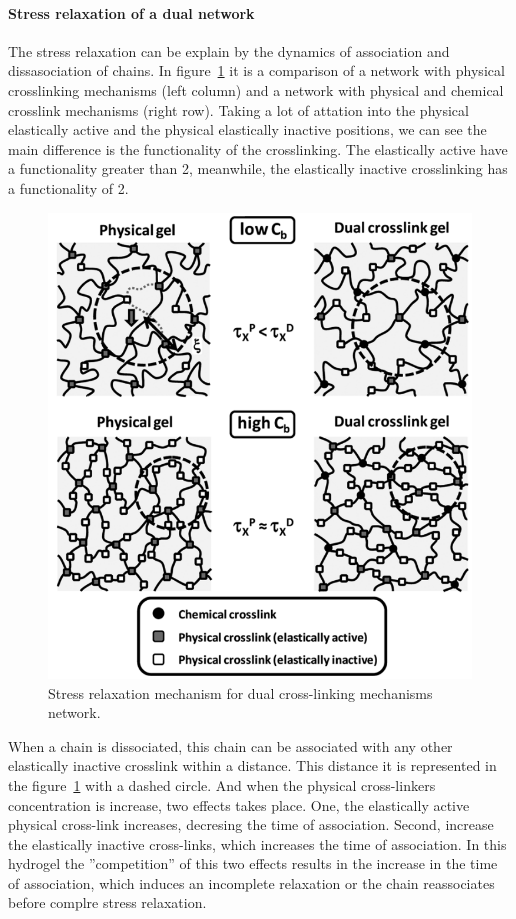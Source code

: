 \paragraph{Stress relaxation of a dual network}
The stress relaxation can be explain by the dynamics of association and dissasociation of chains\citep{naritaViscoelasticPropertiesPolyvinyl2013}.
In figure~\ref{fig:hydroMechResponse1} it is a comparison of a network with physical crosslinking mechanisms (left column) and a network with physical and chemical crosslink mechanisms (right row).
Taking a lot of attation into the physical elastically active and the physical elastically inactive positions, we can see the main difference is the functionality of the crosslinking.
The elastically active have a functionality greater than 2, meanwhile, the elastically inactive crosslinking has a functionality of 2. 

\begin{figure}[ht!]
    \centering
    \includegraphics[width=12cm]{figs/explainMechResponse/dualNetwork1.png}
    \caption{Stress relaxation mechanism for dual cross-linking mechanisms network\citep{naritaViscoelasticPropertiesPolyvinyl2013}.}\label{fig:hydroMechResponse1}
\end{figure}

When a chain is dissociated, this chain can be associated with any other elastically inactive crosslink within a distance.
This distance it is represented in the figure~\ref{fig:hydroMechResponse1} with a dashed circle.
And when the physical cross-linkers concentration is increase, two effects takes place.
One, the elastically active physical cross-link increases, decresing the time of association.
Second, increase the elastically inactive cross-links, which increases the time of association.
In this hydrogel the ''competition'' of this two effects results in the increase in the time of association, which induces an incomplete relaxation or the chain reassociates before complre stress relaxation.

